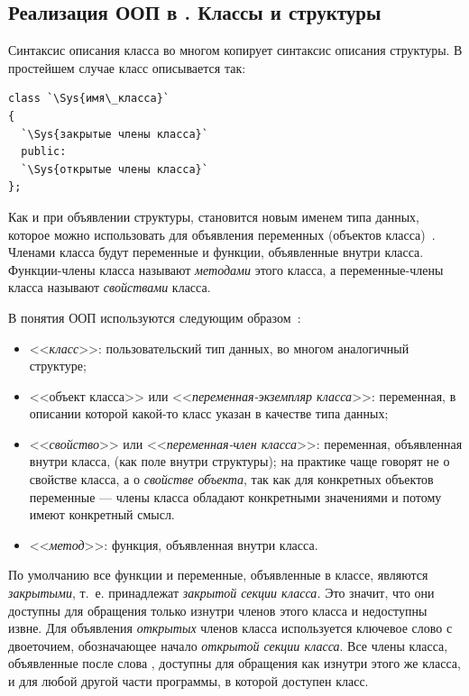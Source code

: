 \subsection[Реализация ООП в \Sys{C++}. Классы и структуры]{Реализация ООП в . Классы и структуры}
Синтаксис описания класса во многом копирует синтаксис описания структуры. В простейшем случае класс описывается  так:
\begin{lstlisting}
class `\Sys{имя\_класса}` 
{
  `\Sys{закрытые члены класса}`
  public:
  `\Sys{открытые члены класса}`
};
\end{lstlisting}

Как и при объявлении структуры,  становится новым именем типа данных, которое можно
использовать для объявления переменных (объектов класса)~\cite{OOP,OOPz}. %
Членами класса будут переменные и функции, объявленные
внутри класса. Функции-члены класса называют \emph{методами} этого класса, а переменные-члены класса
называют \emph{свойствами} класса.

В  понятия ООП используются следующим образом~\cite{OOP,OOPz}: %

\begin{itemize}
\item <<\emph{класс}>>: пользовательский тип данных, во многом аналогичный  структуре;
\item <<объект класса>> или <<\emph{переменная-экземпляр класса}>>: переменная, в описании которой какой-то
класс указан в качестве типа данных;
\item {}<<\emph{свойство}>> или <<\emph{переменная-член класса}>>: переменная, объявленная внутри класса, (как поле внутри структуры);
на практике чаще говорят не о свойстве класса, а о \emph{свойстве объекта}, так как для конкретных
объектов переменные --- члены класса обладают конкретными значениями и потому имеют конкретный смысл.
\item <<\emph{метод}>>: функция, объявленная внутри класса.
\end{itemize}
По умолчанию все функции и переменные, объявленные в классе, являются \emph{закрытыми}, т.~е. принадлежат
\emph{закрытой секции класса.} Это значит, что они доступны для обращения только изнутри членов этого класса и
недоступны извне. Для объявления \emph{открытых} членов класса используется ключевое слово
 с двоеточием, обозначающее начало \emph{открытой секции класса}. Все члены
класса, объявленные после слова , доступны для обращения как изнутри этого же класса, и для
любой другой части программы, в которой доступен класс. 

